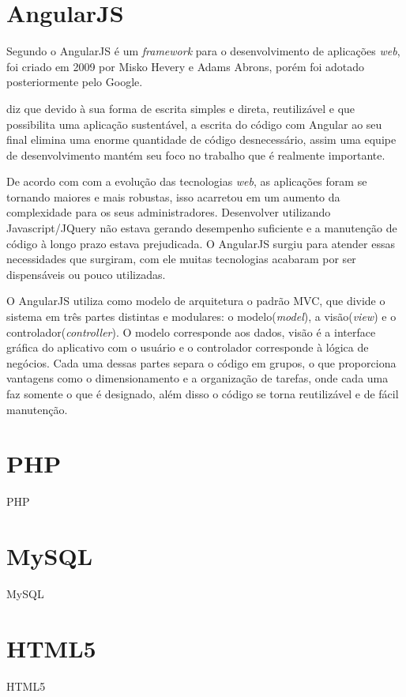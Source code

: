 \section{AngularJS}
	\par Segundo  o AngularJS é um \textit{framework} para o desenvolvimento de aplicações \textit{web}, foi criado em 2009 por Misko Hevery e Adams Abrons, porém foi adotado posteriormente pelo Google.
	\par {} diz que devido à sua forma de escrita simples e direta, reutilizável e que possibilita uma aplicação sustentável, a escrita do código com Angular ao seu final elimina uma enorme quantidade de código desnecessário, assim uma equipe de desenvolvimento mantém seu foco no trabalho que é realmente importante.
	\par De acordo com  com a evolução das tecnologias \textit{web}, as aplicações foram se tornando maiores e mais robustas, isso acarretou em um aumento da complexidade para os seus administradores. Desenvolver utilizando Javascript/JQuery não estava gerando desempenho suficiente e a manutenção de código à longo prazo estava prejudicada. O AngularJS surgiu para atender essas necessidades que surgiram, com ele muitas tecnologias acabaram por ser dispensáveis ou pouco utilizadas.
	\par O AngularJS utiliza como modelo de arquitetura o padrão MVC, que divide o sistema em três partes distintas e modulares: o modelo(\textit{model}), a visão(\textit{view}) e o controlador(\textit{controller}). O modelo corresponde aos dados, visão é a interface gráfica do aplicativo com o usuário e o controlador corresponde à lógica de negócios. Cada uma dessas partes separa o código em grupos, o que proporciona vantagens como o dimensionamento e a organização de tarefas, onde cada uma faz somente o que é designado, além disso o código se torna reutilizável e de fácil manutenção. 
	
	

\section{PHP}
	\par PHP

\section{MySQL}
	\par MySQL

\section{HTML5}
	\par HTML5